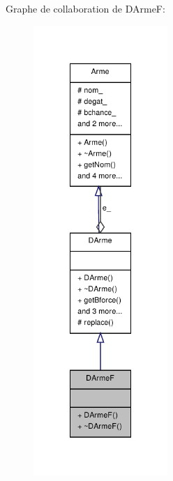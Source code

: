 Graphe de collaboration de D\-Arme\-F\-:
\nopagebreak
\begin{figure}[H]
\begin{center}
\leavevmode
\includegraphics[width=144pt]{class_d_arme_f__coll__graph}
\end{center}
\end{figure}
